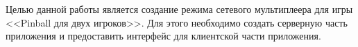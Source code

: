 \Introduction

Целью данной работы является создание режима сетевого мультиплеера для игры <<Pinball для двух игроков>>. Для этого необходимо создать серверную часть приложения и предоставить интерфейс для клиентской части приложения.